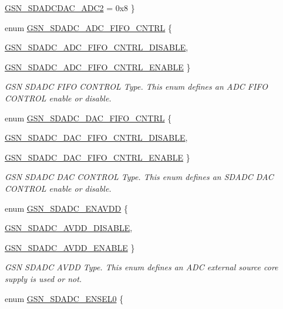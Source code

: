 \begin{DoxyCompactItemize}
\par
\hyperlink{a00583_a56192ea32005a1a454642c75568557aaad8d9982851c33cddf9ca4c2dcbdce09f}{GSN\_\-SDADCDAC\_\-ADC2} =  0x8
 \}
\item 
enum \hyperlink{a00652_ga2935ec509d4dbac8b79ee30623d4c11f}{GSN\_\-SDADC\_\-ADC\_\-FIFO\_\-CNTRL} \{ \par
\hyperlink{a00652_gga2935ec509d4dbac8b79ee30623d4c11fa23331713502922b9d65fff5fb5ff0609}{GSN\_\-SDADC\_\-ADC\_\-FIFO\_\-CNTRL\_\-DISABLE}, 
\par
\hyperlink{a00652_gga2935ec509d4dbac8b79ee30623d4c11fa415e5569f69e30fa01e3ecfc0ef4bf32}{GSN\_\-SDADC\_\-ADC\_\-FIFO\_\-CNTRL\_\-ENABLE}
 \}
\begin{DoxyCompactList}\small\item\em GSN SDADC FIFO CONTROL Type. This enum defines an ADC FIFO CONTROL enable or disable. \end{DoxyCompactList}\item 
enum \hyperlink{a00652_ga3309e966fa4f0d2d297dae6a3bed9599}{GSN\_\-SDADC\_\-DAC\_\-FIFO\_\-CNTRL} \{ \par
\hyperlink{a00652_gga3309e966fa4f0d2d297dae6a3bed9599a7b4646d1784a530487178eecfefaef40}{GSN\_\-SDADC\_\-DAC\_\-FIFO\_\-CNTRL\_\-DISABLE}, 
\par
\hyperlink{a00652_gga3309e966fa4f0d2d297dae6a3bed9599a2f3f695f476584ffb2194191bf43b6ee}{GSN\_\-SDADC\_\-DAC\_\-FIFO\_\-CNTRL\_\-ENABLE}
 \}
\begin{DoxyCompactList}\small\item\em GSN SDADC DAC CONTROL Type. This enum defines an SDADC DAC CONTROL enable or disable. \end{DoxyCompactList}\item 
enum \hyperlink{a00652_gadec6c3ec131e3065cf2061534dfdb320}{GSN\_\-SDADC\_\-ENAVDD} \{ \par
\hyperlink{a00652_ggadec6c3ec131e3065cf2061534dfdb320ae124138038d5451c1ab715007e04a3de}{GSN\_\-SDADC\_\-AVDD\_\-DISABLE}, 
\par
\hyperlink{a00652_ggadec6c3ec131e3065cf2061534dfdb320a296e895cfc98a59cc7db1267ea1ac740}{GSN\_\-SDADC\_\-AVDD\_\-ENABLE}
 \}
\begin{DoxyCompactList}\small\item\em GSN SDADC AVDD Type. This enum defines an ADC external source core supply is used or not. \end{DoxyCompactList}\item 
enum \hyperlink{a00652_ga6258977695af5f9fbae5edbdc75d8387}{GSN\_\-SDADC\_\-ENSEL0} \{ \par

\end{DoxyCompactItemize}
